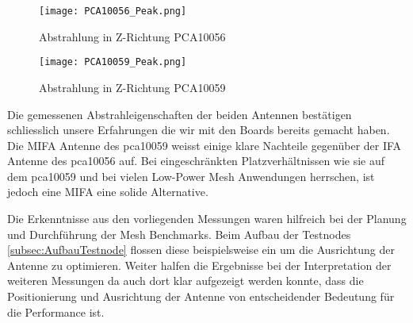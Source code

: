 \begin{figure}[!htbp]
\centering
\begin{minipage}[b]{0.49\linewidth}
	\centering
	\texttt{[image: PCA10056\_Peak.png]}
	\caption{Abstrahlung in Z-Richtung PCA10056}
	\label{fig:PCA10056Peak}
\end{minipage}
\begin{minipage}[b]{0.49\linewidth}
	\centering
	\texttt{[image: PCA10059\_Peak.png]}
	\caption{Abstrahlung in Z-Richtung PCA10059}
	\label{fig:PCA10059Peak}
\end{minipage}
\end{figure}

Die gemessenen Abstrahleigenschaften der beiden Antennen bestätigen schliesslich unsere Erfahrungen die wir mit den Boards bereits gemacht haben. Die MIFA Antenne des pca10059 weisst einige klare Nachteile gegenüber der IFA Antenne des pca10056 auf. Bei eingeschränkten Platzverhältnissen wie sie auf dem pca10059 und bei vielen Low-Power Mesh Anwendungen herrschen, ist jedoch eine MIFA eine solide Alternative.

Die Erkenntnisse aus den vorliegenden Messungen waren hilfreich bei der Planung und Durchführung der Mesh Benchmarks. Beim Aufbau der Testnodes \ref{subsec:AufbauTestnode} flossen diese beispielsweise ein um die Ausrichtung der Antenne zu optimieren. Weiter halfen die Ergebnisse bei der Interpretation der weiteren Messungen da auch dort klar aufgezeigt werden konnte, dass die Positionierung und Ausrichtung der Antenne von entscheidender Bedeutung für die Performance ist.

%
%

